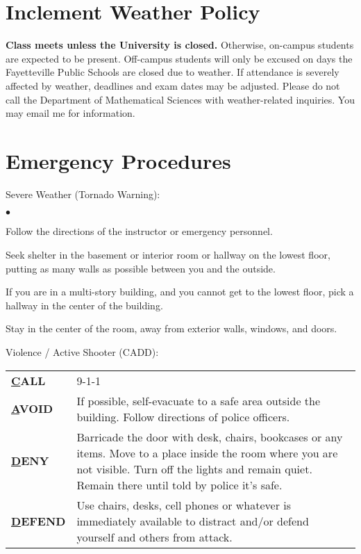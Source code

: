 \documentclass[margin,line,pifont,palatino,courier]{res}
\newenvironment{list2}{
  \begin{list}{$\bullet$}{%
      \setlength{\itemsep}{0in}
      \setlength{\parsep}{0in} \setlength{\parskip}{0in}
      \setlength{\topsep}{0in} \setlength{\partopsep}{0in}
      \setlength{\leftmargin}{0.2in}}}{\end{list}}
\begin{document}
\begin{resume}
\section{\sc Inclement Weather Policy} {\bf Class meets unless the University is closed.}  Otherwise, on-campus students are expected to be present.  Off-campus students will only be excused on days the Fayetteville Public Schools are closed due to weather.  If attendance is severely affected by weather, deadlines and exam dates may be adjusted.  Please do not call the Department of Mathematical Sciences with weather-related inquiries.  You may email me for information.

\section{\sc Emergency Procedures} Severe Weather (Tornado Warning):
\begin{list2}
\item Follow the directions of the instructor or emergency personnel.
\item Seek shelter in the basement or interior room or hallway on the lowest floor, putting as many walls as possible between you and the outside.
\item If you are in a multi-story building, and you cannot get to the lowest floor, pick a hallway in the center of the building.
\item Stay in the center of the room, away from exterior walls, windows, and doors.
\end{list2}

Violence / Active Shooter (CADD):

\vspace{-.25in}
\begin{center}
\begin{tabular}{@{}lp{}}
{\bf \underline CALL} & 9-1-1 \\
{\bf \underline AVOID} & If possible, self-evacuate to a safe area outside the building.  Follow directions of police officers. \\
{\bf \underline DENY} & Barricade the door with desk, chairs, bookcases or any items.  Move to a place inside the room where you are not visible.  Turn off the lights and remain quiet.  Remain there until told by police it's safe. \\
{\bf \underline DEFEND} & Use chairs, desks, cell phones or whatever is immediately available to distract and/or defend yourself and others from attack. \\
\end{tabular}
\end{center}


\end{resume}
\end{document}
